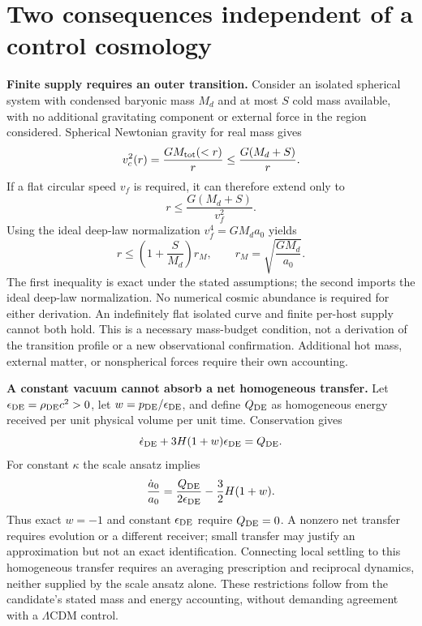 \documentclass[11pt]{article}
\begin{document}
\section{Two consequences independent of a control cosmology}
\textbf{Finite supply requires an outer transition.}
Consider an isolated spherical system with condensed baryonic mass $M_d$ and at most $S$ cold mass available, with no additional gravitating component or external force in the region considered. Spherical Newtonian gravity for real mass gives
\begin{equation}
 v_c^2(r)=\frac{G M_{\rm tot}(<r)}r\leq\frac{G(M_d+S)}r.
\end{equation}
If a flat circular speed $v_f$ is required, it can therefore extend only to
\begin{equation}\label{eq:edge}
 r\leq\frac{G(M_d+S)}{v_f^2}.
\end{equation}
Using the ideal deep-law normalization $v_f^4=GM_da_0$ yields
\begin{equation}
 r\leq\left(1+\frac{S}{M_d}\right)r_M,\qquad r_M=\sqrt{\frac{GM_d}{a_0}}.
\end{equation}
The first inequality is exact under the stated assumptions; the second imports the ideal deep-law normalization. No numerical cosmic abundance is required for either derivation. An indefinitely flat isolated curve and finite per-host supply cannot both hold. This is a necessary mass-budget condition, not a derivation of the transition profile or a new observational confirmation. Additional hot mass, external matter, or nonspherical forces require their own accounting.

\textbf{A constant vacuum cannot absorb a net homogeneous transfer.}
Let $\epsilon_{\rm DE}=\rho_{\rm DE}c^2>0$, let $w=p_{\rm DE}/\epsilon_{\rm DE}$, and define $Q_{\rm DE}$ as homogeneous energy received per unit physical volume per unit time. Conservation gives
\begin{equation}
 \dot\epsilon_{\rm DE}+3H(1+w)\epsilon_{\rm DE}=Q_{\rm DE}.
\end{equation}
For constant $\kappa$ the scale ansatz implies
\begin{equation}
 \frac{\dot a_0}{a_0}=\frac{Q_{\rm DE}}{2\epsilon_{\rm DE}}-\frac32H(1+w).
\end{equation}
Thus exact $w=-1$ and constant $\epsilon_{\rm DE}$ require $Q_{\rm DE}=0$. A nonzero net transfer requires evolution or a different receiver; small transfer may justify an approximation but not an exact identification. Connecting local settling to this homogeneous transfer requires an averaging prescription and reciprocal dynamics, neither supplied by the scale ansatz alone. These restrictions follow from the candidate's stated mass and energy accounting, without demanding agreement with a $\Lambda$CDM control.
\end{document}
